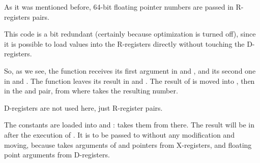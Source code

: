 \label{FPU_passing_floats_ARM}



As it was mentioned before, 64-bit floating pointer numbers are passed in R-registers pairs.

This code is a bit redundant (certainly because optimization is turned off), 
since it is possible to load values into the R-registers directly without touching the D-registers.

So, as we see, the  function receives its first argument in  and , and its second one in  and . 
The function leaves its result in  and .
The result of  is moved into , then in the  and  pair, from where \printf takes the resulting number.




D-registers are not used here, just R-register pairs.




The constants are loaded into  and :  takes them from there.
The result will be in  after the execution of .
It is to be passed to \printf without any modification and moving, 
because \printf takes arguments of  
and pointers from X-registers, and floating point arguments from D-registers.

